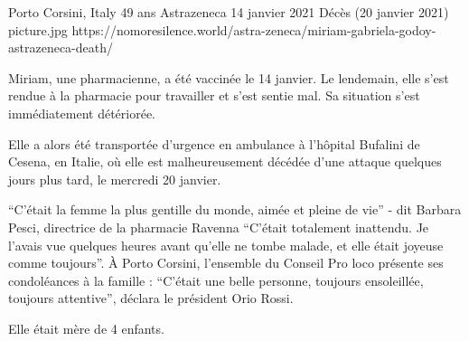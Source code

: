 {Porto Corsini, Italy}
{49 ans}
{Astrazeneca}
{14 janvier 2021}
{Décès (20 janvier 2021)}
{picture.jpg}
{https://nomoresilence.world/astra-zeneca/miriam-gabriela-godoy-astrazeneca-death/}
{

Miriam, une pharmacienne, a été vaccinée le 14 janvier. Le lendemain, elle s'est
rendue à la pharmacie pour travailler et s'est sentie mal. Sa situation s'est
immédiatement détériorée.

Elle a alors été transportée d'urgence en ambulance à l'hôpital Bufalini de
Cesena, en Italie, où elle est malheureusement décédée d'une attaque quelques
jours plus tard, le mercredi 20 janvier.

“C'était la femme la plus gentille du monde, aimée et pleine de vie” - dit
Barbara Pesci, directrice de la pharmacie Ravenna “C'était totalement
inattendu. Je l'avais vue quelques heures avant qu'elle ne tombe malade, et elle
était joyeuse comme toujours”. À Porto Corsini, l'ensemble du Conseil Pro loco
présente ses condoléances à la famille : “C'était une belle personne, toujours
ensoleillée, toujours attentive”, déclara le président Orio Rossi.

Elle était mère de 4 enfants.

}
